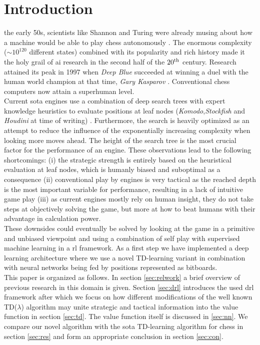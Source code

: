 \documentclass[twocolumn]{phdsymp} %
\begin{document}
\section{Introduction}
 the early 50s, scientists like Shannon and Turing were already musing about how a machine would be able to play chess autonomously \cite{shannon,turing}. The enormous complexity ($\sim 10^{120}$ different states) combined with its popularity and rich history made it the holy grail of \gls{ai} research in the second half of the $20^{\textnormal{th}}$ century. Research attained its peak in 1997 when \textit{Deep Blue} succeeded at winning a duel with the human world champion at that time, \textit{Gary Kasparov} \cite{deepblue}. Conventional chess computers now attain a superhuman level.\\
Current \gls{sota} engines use a combination of deep search trees with expert knowledge heuristics to evaluate positions at leaf nodes (\textit{Komodo},\textit{Stockfish} and \textit{Houdini} at time of writing) \cite{sota}. Furthermore, the search is heavily optimized as an attempt to reduce the influence of the exponentially increasing complexity when looking more moves ahead. The height of the search tree is the most crucial factor for the performance of an engine. These observations lead to the following shortcomings: (i) the strategic strength is entirely based on the heuristical evaluation at leaf nodes, which is humanly biased and suboptimal as a consequence (ii) conventional play by engines is very tactical as the reached depth is the most important variable for performance, resulting in a lack of intuitive game play (iii) as current engines mostly rely on human insight, they do not take steps at objectively solving the game, but more at how to beat humans with their advantage in calculation power.\\
These downsides could eventually be solved by looking at the game in a primitive and unbiased viewpoint and using a combination of self play with supervised machine learning in a \gls{rl} framework. As a first step we have implemented a deep learning architecture where we use a novel TD-learning variant in combination with neural networks being fed by positions represented as bitboards.\\
This paper is organized as follows. In section \ref{sec:relwork} a brief overview of previous research in this domain is given. Section \ref{sec:drl} introduces the used \gls{drl} framework after which we focus on how different modifications of the well known TD($\lambda$) algorithm may unite strategic and tactical information into the value function in section \ref{sec:td}. The value function itself is discussed in \ref{sec:nn}. We compare our novel algorithm with the \gls{sota} TD-learning algorithm for chess in section \ref{sec:res} and form an appropriate conclusion in section \ref{sec:con}.
\end{document}
